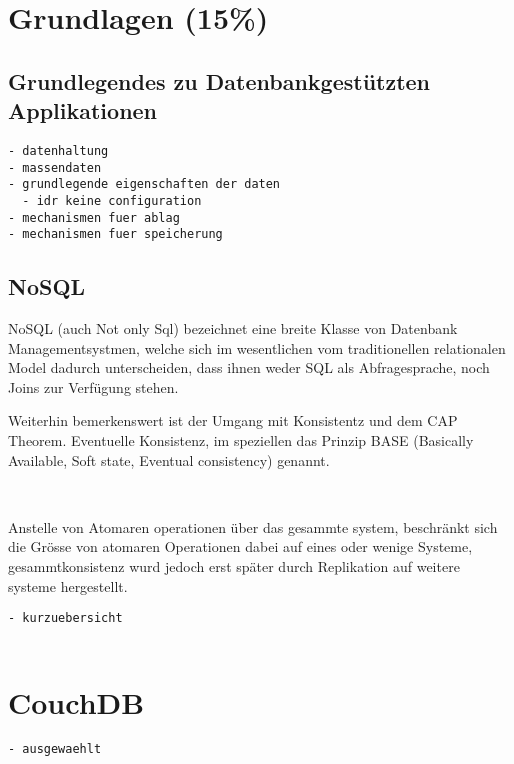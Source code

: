 \chapter{Grundlagen (15\%)}

\section{Grundlegendes zu Datenbankgest\"utzten Applikationen}

\begin{verbatim}
- datenhaltung
- massendaten
- grundlegende eigenschaften der daten
  - idr keine configuration
- mechanismen fuer ablag
- mechanismen fuer speicherung
\end{verbatim}



\section{NoSQL}

NoSQL (auch Not only Sql) bezeichnet eine breite Klasse
von Datenbank Managementsystmen, welche sich im wesentlichen
vom traditionellen relationalen Model dadurch unterscheiden,
dass ihnen weder SQL als Abfragesprache, noch Joins zur Verfügung stehen.
~ \cite{wikipedia:nosql}



Weiterhin bemerkenswert ist der Umgang mit Konsistentz und dem CAP Theorem.
Eventuelle Konsistenz, im speziellen das Prinzip BASE (Basically Available, Soft state, Eventual consistency) genannt.

~ \cite{wikipedia:base}

Anstelle von Atomaren operationen über das gesammte system,
beschränkt sich die Grösse von atomaren Operationen dabei auf eines 
oder wenige Systeme, gesammtkonsistenz wurd jedoch erst später durch Replikation auf weitere systeme hergestellt.


\begin{verbatim}
- kurzuebersicht


\end{verbatim}



\chapter{CouchDB}


\begin{verbatim}
- ausgewaehlt

\end{verbatim}

